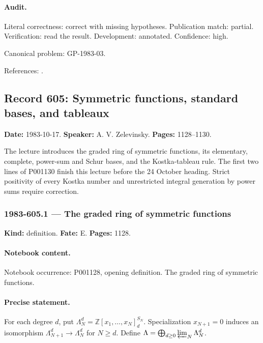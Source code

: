 \paragraph{Audit.} Literal correctness: correct with missing hypotheses. Publication match: partial. Verification: read the result. Development: annotated. Confidence: high.

\noindent Canonical problem: GP-1983-03.\par

\noindent References: \citep{daifreed1994eta,wangwenwitten2019new}.\par

\subsection{Record 605: Symmetric functions, standard bases, and tableaux}

\label{talk:605}

\noindent\textbf{Date:} 1983-10-17. \textbf{Speaker:} A. V. Zelevinsky. \textbf{Pages:} 1128--1130.\par

The lecture introduces the graded ring of symmetric functions, its elementary, complete, power-sum and Schur bases, and the Kostka-tableau rule. The first two lines of P001130 finish this lecture before the 24 October heading. Strict positivity of every Kostka number and unrestricted integral generation by power sums require correction.

\subsubsection{1983-605.1 --- The graded ring of symmetric functions}

\label{item:1983-605.1}

\noindent\textbf{Kind:} definition. \textbf{Fate:} E. \textbf{Pages:} 1128.\par

\paragraph{Notebook content.} Notebook occurrence: P001128, opening definition. The graded ring of symmetric functions.

\paragraph{Precise statement.} For each degree \(d\), put \(\Lambda_N^d=\mathbb Z[x_1,\ldots,x_N]^{S_N}_d\). Specialization \(x_{N+1}=0\) induces an isomorphism \(\Lambda_{N+1}^d\to\Lambda_N^d\) for \(N\ge d\). Define \(\Lambda=\bigoplus_{d\ge0}\varprojlim_N\Lambda_N^d\).

